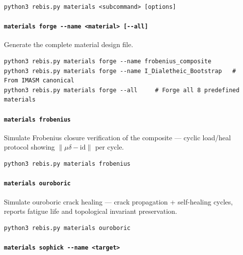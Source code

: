 \documentclass[12pt,a4paper]{article}
\begin{document}
\begin{verbatim}
python3 rebis.py materials <subcommand> [options]
\end{verbatim}

\hypertarget{materials-forge---name-material---all}{%
\paragraph{\texorpdfstring{\texttt{materials\ forge\ -\/-name\ \textless{}material\textgreater{}\ {[}-\/-all{]}}}{materials forge -\/-name \textless material\textgreater{} {[}-\/-all{]}}}\label{materials-forge---name-material---all}}

Generate the complete material design file.

\begin{verbatim}
python3 rebis.py materials forge --name frobenius_composite
python3 rebis.py materials forge --name I_Dialetheic_Bootstrap   # From IMASM canonical
python3 rebis.py materials forge --all     # Forge all 8 predefined materials
\end{verbatim}

\hypertarget{materials-frobenius}{%
\paragraph{\texorpdfstring{\texttt{materials\ frobenius}}{materials frobenius}}\label{materials-frobenius}}

Simulate Frobenius closure verification of the composite --- cyclic
load/heal protocol showing \(\|\mu\delta-\text{id}\|\) per cycle.

\begin{verbatim}
python3 rebis.py materials frobenius
\end{verbatim}

\hypertarget{materials-ouroboric}{%
\paragraph{\texorpdfstring{\texttt{materials\ ouroboric}}{materials ouroboric}}\label{materials-ouroboric}}

Simulate ouroboric crack healing --- crack propagation + self-healing
cycles, reports fatigue life and topological invariant preservation.

\begin{verbatim}
python3 rebis.py materials ouroboric
\end{verbatim}

\hypertarget{materials-sophick---name-target}{%
\paragraph{\texorpdfstring{\texttt{materials\ sophick\ -\/-name\ \textless{}target\textgreater{}}}{materials sophick -\/-name \textless target\textgreater{}}}\label{materials-sophick---name-target}}
\end{document}
